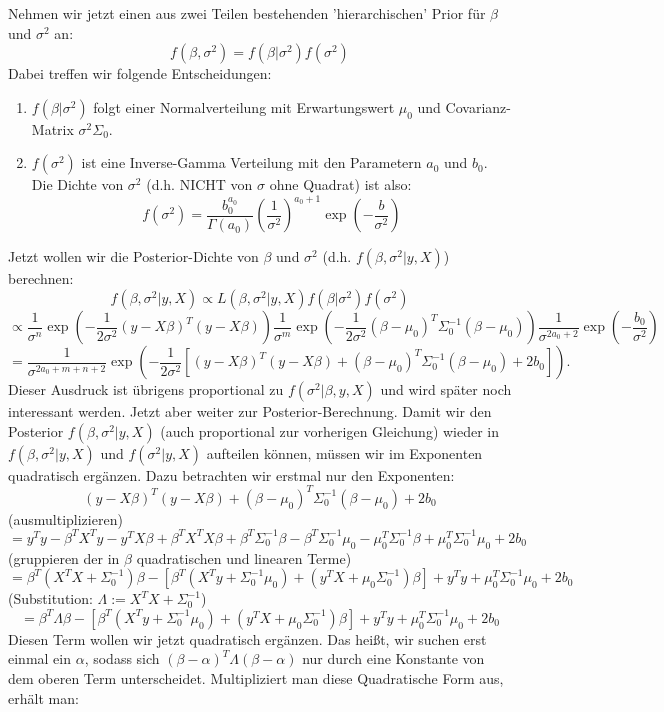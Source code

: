 \documentclass{article}
\begin{document}
    Nehmen wir jetzt einen aus zwei Teilen bestehenden 'hierarchischen' Prior für \(\beta\) und \(\sigma^2\) an:\[
    f(\beta,\sigma^2)=f(\beta|\sigma^2)f(\sigma^2)
    \]Dabei treffen wir folgende Entscheidungen:\begin{enumerate}
        \item \(f(\beta|\sigma^2)\) folgt einer Normalverteilung mit Erwartungswert \(\mu_0\) und Covarianz-Matrix \(\sigma^2\Sigma_0\).
        \item \(f(\sigma^2)\) ist eine Inverse-Gamma Verteilung mit den Parametern \(a_0\) und \(b_0\). Die Dichte von \(\sigma^2\) (d.h. NICHT von \(\sigma\) ohne Quadrat) ist also:\[
            f(\sigma^2)=\frac{b_0^{a_0}}{\Gamma(a_0)}(\frac1{\sigma^2})^{a_0+1}\exp(-\frac b{\sigma^2})
        \]

    \end{enumerate}
    Jetzt wollen wir die Posterior-Dichte von \(\beta\) und \(\sigma^2\) (d.h. \(f(\beta,\sigma^2|y,X)\)) berechnen:
    \[
        f(\beta,\sigma^2|y,X)\propto L(\beta,\sigma^2|y,X)f(\beta|\sigma^2)f(\sigma^2)
    \]\[
    \propto \frac{1}{\sigma^n}\exp(-\frac1{2\sigma^2}(y-X\beta)^T(y-X\beta))\frac1{\sigma^m}\exp(-\frac1{2\sigma^2}(\beta-\mu_0)^T\Sigma_0^{-1}(\beta-\mu_0))\frac1{\sigma^{2a_0+2}}\exp(-\frac {b_0}{\sigma^2})
    \]\[
    =\frac{1}{\sigma^{2a_0+m+n+2}}\exp(-\frac1{2\sigma^2}[(y-X\beta)^T(y-X\beta)+(\beta-\mu_0)^T\Sigma_0^{-1}(\beta-\mu_0)+2b_0]).
    \] Dieser Ausdruck ist übrigens proportional zu \(f(\sigma^2|\beta,y,X)\) und wird später noch interessant werden. Jetzt aber weiter zur Posterior-Berechnung. Damit wir den Posterior \(f(\beta,\sigma^2|y,X)\) (auch proportional zur vorherigen Gleichung) wieder in \(f(\beta,\sigma^2|y,X)\) und \(f(\sigma^2|y,X)\) aufteilen können, müssen wir im Exponenten quadratisch ergänzen. Dazu betrachten wir erstmal nur den Exponenten:\[
    (y-X\beta)^T(y-X\beta)+(\beta-\mu_0)^T\Sigma_0^{-1}(\beta-\mu_0)+2b_0
    \](ausmultiplizieren)\[
    =y^Ty-\beta^TX^Ty-y^TX\beta+\beta^TX^TX\beta+\beta^T\Sigma_0^{-1}\beta-\beta^T\Sigma_0^{-1}\mu_0-\mu_0^T\Sigma_0^{-1}\beta+\mu_0^T\Sigma_0^{-1}\mu_0+2b_0
    \](gruppieren der in \(\beta\) quadratischen und linearen Terme)\[
    =\beta^T(X^TX+\Sigma_0^{-1})\beta -[\beta^T(X^Ty+\Sigma_0^{-1}\mu_0)+(y^TX+\mu_0\Sigma_0^{-1})\beta]+y^Ty+\mu_0^T\Sigma_0^{-1}\mu_0+2b_0
    \](Substitution: \(\Lambda:=X^TX+\Sigma_0^{-1}\))\[
    =\beta^T\Lambda\beta -[\beta^T(X^Ty+\Sigma_0^{-1}\mu_0)+(y^TX+\mu_0\Sigma_0^{-1})\beta]+y^Ty+\mu_0^T\Sigma_0^{-1}\mu_0+2b_0
    \]
    Diesen Term wollen wir jetzt quadratisch ergänzen. Das heißt, wir suchen erst einmal ein \(\alpha\), sodass sich \((\beta-\alpha)^T\Lambda(\beta-\alpha)\) nur durch eine Konstante von dem oberen Term unterscheidet. Multipliziert man diese Quadratische Form aus, erhält man:
\end{document}
